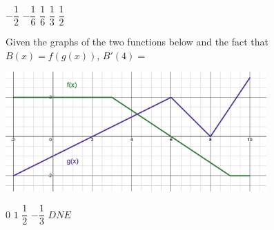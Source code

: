 \begin{questions}
    \begin{oneparchoices}
        \choice $-\dfrac{1}{2}$
        \choice $-\dfrac{1}{6}$
        \choice $\dfrac{1}{6}$
        \choice $\dfrac{1}{3}$
        \choice $\dfrac{1}{2}$
    \end{oneparchoices} \par \horizontalline

    \question Given the graphs of the two functions below and the fact that $B(x) = f(g(x))$, $B'(4) =$ 
    \begin{center}
        \includegraphics[width = 0.75\textwidth]{Support/Chapter 1 Graphics/1.7-Graphic10.png}
    \end{center} \vspace{11pt}

    \begin{oneparchoices}
        \choice $0$
        \choice $1$
        \choice $\dfrac{1}{2}$
        \choice $-\dfrac{1}{3}$
        \choice $DNE$
    \end{oneparchoices} \par \horizontalline
\end{questions} 